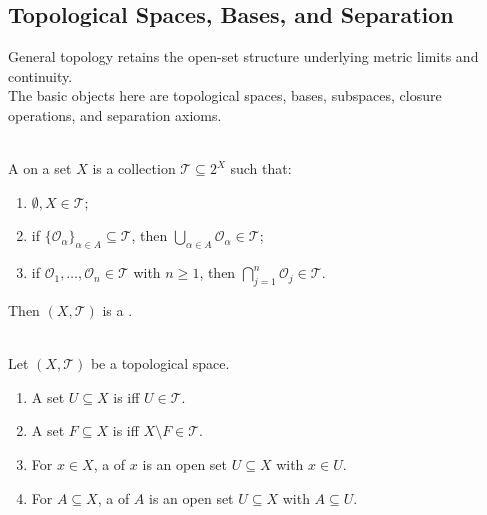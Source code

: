 \subsection{Topological Spaces, Bases, and Separation}

General topology retains the open-set structure underlying metric limits and continuity.\\
The basic objects here are topological spaces, bases, subspaces, closure operations, and separation axioms.

\begin{definition} \label{def:topological-space} \\
A  on a set $X$ is a collection $\mathcal{T}\subseteq 2^X$ such that:
\begin{enumerate}[label=(\roman*)]
\setlength{\itemsep}{0pt}
\item $\emptyset,X\in\mathcal{T}$;
\item if $\{\mathcal{O}_\alpha\}_{\alpha\in A}\subseteq\mathcal{T}$, then $\bigcup\limits_{\alpha\in A}\mathcal{O}_\alpha\in\mathcal{T}$;
\item if $\mathcal{O}_1,\ldots,\mathcal{O}_n\in\mathcal{T}$ with $n\geq1$, then $\bigcap\limits_{j=1}^n\mathcal{O}_j\in\mathcal{T}$.
\end{enumerate}
Then $(X,\mathcal{T})$ is a .
\end{definition}

\begin{definition} \label{def:open-closed-neighborhood-topological} \\
Let $(X,\mathcal{T})$ be a topological space.
\begin{enumerate}[label=(\roman*)]
\setlength{\itemsep}{0pt}
\item A set $U\subseteq X$ is  iff $U\in\mathcal{T}$.
\item A set $F\subseteq X$ is  iff $X\setminus F\in\mathcal{T}$.
\item For $x\in X$, a  of $x$ is an open set $U\subseteq X$ with $x\in U$.
\item For $A\subseteq X$, a  of $A$ is an open set $U\subseteq X$ with $A\subseteq U$.
\end{enumerate}
\end{definition}

